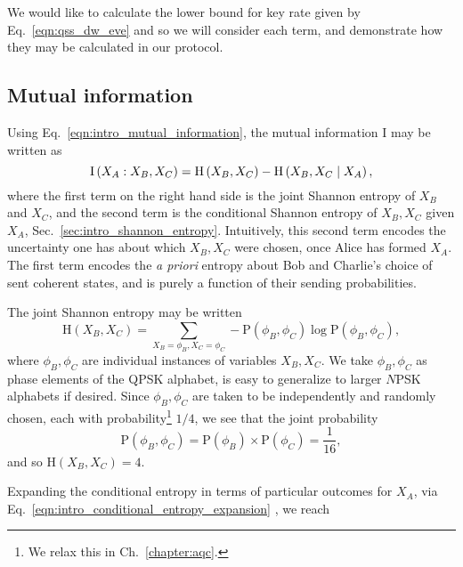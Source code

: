 We would like to calculate the lower bound for key rate given by Eq.~\ref{eqn:qss_dw_eve} and so we will consider each term, and demonstrate how they may be calculated in our protocol.



\subsection{Mutual information}

Using Eq.~\ref{eqn:intro_mutual_information}, the mutual information $\text{I}$ may be written as 
\begin{equation}\label{eqn:qss_deriv_1}
\text{I}\left(X_A : X_B, X_C\right) = \text{H}\left(X_B, X_C\right) - \text{H} \left(X_B, X_C \; \middle| \; X_A\right),
\end{equation}
where the first term on the right hand side is the joint Shannon entropy of $X_B$ and $X_C$, and the second term is the conditional Shannon entropy of $X_B, X_C$ given $X_A$, Sec.~\ref{sec:intro_shannon_entropy}. Intuitively, this second term encodes the uncertainty one has about which $X_B, X_C$ were chosen, once Alice has formed $X_A$. The first term encodes the \emph{a priori} entropy about Bob and Charlie's choice of sent coherent states, and is purely a function of their sending probabilities.

The joint Shannon entropy may be written
\begin{equation}\label{eqn:qss_deriv_2}
\text{H}\left(X_B, X_C\right) = \sum_{X_B=\phi_B, X_C=\phi_C} - \text{P}\left(\phi_B, \phi_C\right) \log \text{P}\left(\phi_B, \phi_C\right),
\end{equation}
where $\phi_B, \phi_C$ are individual instances of variables $X_B, X_C$. We take $\phi_B, \phi_C$ as phase elements of the QPSK alphabet, is easy to generalize to larger $N$PSK alphabets if desired. Since $\phi_B, \phi_C$ are taken to be independently and randomly chosen, each with probability\footnote{We relax this in Ch.~\ref{chapter:aqc}.} $1/4$, we see that the joint probability
\begin{equation}\label{eqn:qss_deriv_3}
\text{P}\left(\phi_B, \phi_C\right) = \text{P}\left(\phi_B\right)\times \text{P}\left(\phi_C\right) = \frac{1}{16},
\end{equation}
and so $\text{H}\left(X_B, X_C\right) = 4$. %

Expanding the conditional entropy in terms of particular outcomes for $X_A$, via Eq.~\ref{eqn:intro_conditional_entropy_expansion}%
, we reach

